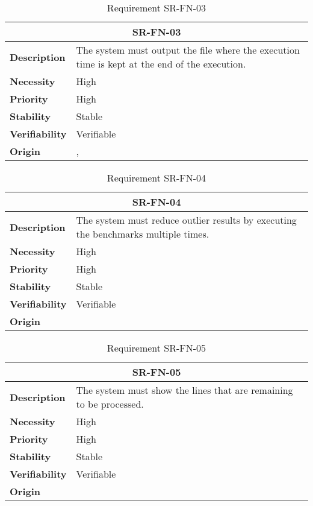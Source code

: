\begin{table}[H]
    \centering
    \begin{tabular}{l p{10cm}}
        \toprule
        \multicolumn{2}{c}{SR-FN-03} \\
        \toprule
        \textbf{Description}        &  The system must output the file where the execution time is kept at the end of the execution. \\
        \textbf{Necessity}          &  High \\
        \textbf{Priority}           &  High \\
        \textbf{Stability}          &  Stable \\
        \textbf{Verifiability}      & Verifiable \\
        \textbf{Origin}             & \textit{\nameref{tab:ur-ca-09}}, \textit{\nameref{tab:ur-ca-14}} \\
    \end{tabular}
    \caption{Requirement SR-FN-03}
    \label{tab:sr-fn-03}
\end{table}

\begin{table}[H]
    \centering
    \begin{tabular}{l p{10cm}}
        \toprule
        \multicolumn{2}{c}{SR-FN-04} \\
        \toprule
        \textbf{Description}        &  The system must reduce outlier results by executing the benchmarks multiple times. \\
        \textbf{Necessity}          &  High \\
        \textbf{Priority}           &  High \\
        \textbf{Stability}          &  Stable \\
        \textbf{Verifiability}      & Verifiable \\
        \textbf{Origin}             & \textit{\nameref{tab:ur-ca-12}} \\
    \end{tabular}
    \caption{Requirement SR-FN-04}
    \label{tab:sr-fn-04}
\end{table}

\begin{table}[H]
    \centering
    \begin{tabular}{l p{10cm}}
        \toprule
        \multicolumn{2}{c}{SR-FN-05} \\
        \toprule
        \textbf{Description}        &  The system must show the lines that are remaining to be processed. \\
        \textbf{Necessity}          &  High \\
        \textbf{Priority}           &  High \\
        \textbf{Stability}          &  Stable \\
        \textbf{Verifiability}      & Verifiable \\
        \textbf{Origin}             & \textit{\nameref{tab:ur-ca-15}} \\
    \end{tabular}
    \caption{Requirement SR-FN-05}
    \label{tab:sr-fn-05}
\end{table}

